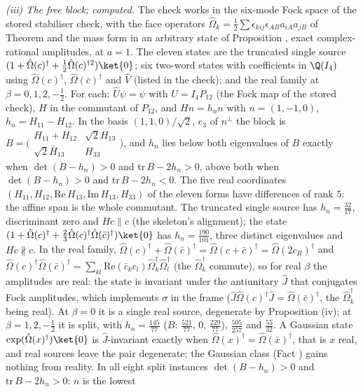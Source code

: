 \emph{(iii) The free block; computed.} The check works in the six-mode Fock space of the stored stabiliser check, with the face operators $\hat\Omega_{k} = \tfrac12\sum\epsilon_{kij}\epsilon_{AB}a_{iA}a_{jB}$ of Theorem  and the mass form in an arbitrary state of Proposition , exact complex-rational amplitudes, at $a = 1$. The eleven states are the truncated single source $(1 + \hat\Omega(c)^{\dagger} + \tfrac12\hat\Omega(c)^{\dagger 2})\ket{0}$; six two-word states with coefficients in $\Q(I_4)$ using $\hat\Omega(c)^{\dagger}$, $\hat\Omega(\bar{c})^{\dagger}$ and $\hat{V}$ (listed in the check); and the real family at $\beta = 0, 1, 2, -\tfrac12$. For each: $\hat{U}\psi = \psi$ with $U = I_4 P_{12}$ (the Fock map of the stored check), $H$ in the commutant of $P_{12}$, and $Hn = h_{n}n$ with $n = (1, -1, 0)$, $h_{n} = H_{11} - H_{12}$. In the basis $(1,1,0)/\sqrt2$, $e_{3}$ of $n^{\perp}$ the block is $B = \bigl(\begin{smallmatrix} H_{11} + H_{12} & \sqrt2 H_{13}\\ \sqrt2\bar{H}_{13} & H_{33}\end{smallmatrix}\bigr)$, and $h_{n}$ lies below both eigenvalues of $B$ exactly when $\det(B - h_{n}) > 0$ and $\mathrm{tr}\,B - 2h_{n} > 0$, above both when $\det(B - h_{n}) > 0$ and $\mathrm{tr}\,B - 2h_{n} < 0$. The five real coordinates $(H_{11}, H_{12}, \mathrm{Re}\,H_{13}, \mathrm{Im}\,H_{13}, H_{33})$ of the eleven forms have differences of rank $5$: the affine span is the whole commutant. The truncated single source has $h_{n} = \tfrac{32}{17}$, discriminant zero and $Hc \parallel c$ (the skeleton's alignment); the state $(1 + \hat\Omega(c)^{\dagger} + \tfrac23\hat\Omega(c)^{\dagger}\hat\Omega(\bar{c})^{\dagger})\ket{0}$ has $h_{n} = \tfrac{190}{101}$, three distinct eigenvalues and $Hc \not\parallel c$. In the real family, $\hat\Omega(c)^{\dagger} + \hat\Omega(\bar{c})^{\dagger} = \hat\Omega(c + \bar{c})^{\dagger} = \hat\Omega(2c_{R})^{\dagger}$ and $\hat\Omega(c)^{\dagger}\hat\Omega(\bar{c})^{\dagger} = \sum_{kl}\mathrm{Re}(\bar{c}_{k}c_{l})\hat\Omega_{k}^{\dagger}\hat\Omega_{l}^{\dagger}$ (the $\hat\Omega_{k}^{\dagger}$ commute), so for real $\beta$ the amplitudes are real: the state is invariant under the antiunitary $\hat{J}$ that conjugates Fock amplitudes, which implements $\sigma$ in the frame ($\hat{J}\hat\Omega(c)^{\dagger}\hat{J} = \hat\Omega(\bar{c})^{\dagger}$, the $\hat\Omega_{k}^{\dagger}$ being real). At $\beta = 0$ it is a single real source, degenerate by Proposition (iv); at $\beta = 1, 2, -\tfrac12$ it is split, with $h_{n} = \tfrac{145}{77}$ ($B$: $\tfrac{521}{77}$, $0$, $\tfrac{229}{77}$), $\tfrac{505}{257}$ and $\tfrac{55}{32}$. A Gaussian state $\exp(\hat\Omega(x)^{\dagger})\ket{0}$ is $\hat{J}$-invariant exactly when $\hat\Omega(x)^{\dagger} = \hat\Omega(\bar{x})^{\dagger}$, that is $x$ real, and real sources leave the pair degenerate; the Gaussian class (Fact ) gains nothing from reality. In all eight split instances $\det(B - h_{n}) > 0$ and $\mathrm{tr}\,B - 2h_{n} > 0$: $n$ is the lowest 